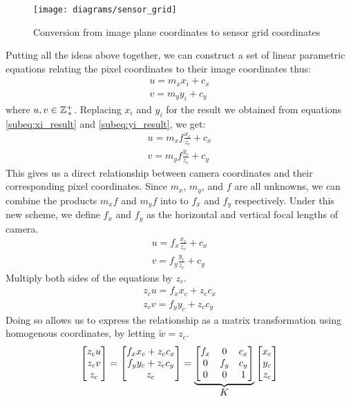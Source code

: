 \begin{figure}[H]
    \centering
    \texttt{[image: diagrams/sensor\_grid]}
    \caption{Conversion from image plane coordinates to sensor grid coordinates}
\end{figure}
Putting all the ideas above together, we can construct a set of linear parametric equations relating the pixel coordinates to their image coordinates thus:
\begin{align*}
    u = m_x x_i + c_x \\
    v = m_y y_i + c_y
\end{align*}
where $u,v \in \mathbb{Z}^+_{\,*}$. Replacing $x_i$ and $y_i$ for the result we obtained from equations \ref{subeq:xi_result} and \ref{subeq:yi_result}, we get:
\begin{align*}
    u = m_x f \frac{x_c}{z_c} + c_x \\
    v = m_y f \frac{y_c}{z_c} + c_y
\end{align*}
This gives us a direct relationship between camera coordinates and their corresponding pixel coordinates. Since $m_x$, $m_y$, and $f$ are all unknowns, we can combine the products $m_x f$ and $m_y f$ into to $f_x$ and $f_y$ respectively. Under this new scheme, we define $f_x$ and $f_y$ as the horizontal and vertical focal lengths of camera.
\begin{gather}
    u = f_x \frac{x_c}{z_c} + c_x \\
    v = f_y \frac{y_c}{z_c} + c_y
\end{gather}
Multiply both sides of the equations by $z_c$.
\begin{subequations}
    \begin{gather*}
        z_c u = f_x x_c + z_c c_x \\
        z_c v = f_y y_c + z_c c_y
    \end{gather*}
\end{subequations}
Doing so allows us to express the relationship as a matrix transformation using homogenous coordinates, by letting $\widetilde{w} = z_c$.
\begin{equation}
    \begin{bmatrix}
        z_c u \\ z_c v \\ z_c
    \end{bmatrix}
    =
    \begin{bmatrix}
        f_x x_c + z_c c_x \\ f_y y_c + z_c c_y \\ z_c
    \end{bmatrix}
    =
    \underbrace{
        \begin{bmatrix}
            f_x & 0   & c_x \\
            0   & f_y & c_y \\
            0   & 0   & 1
        \end{bmatrix}
    }_{\mathlarger{K}}
    \begin{bmatrix}
        x_c \\ y_c \\ z_c
    \end{bmatrix}
\end{equation}

